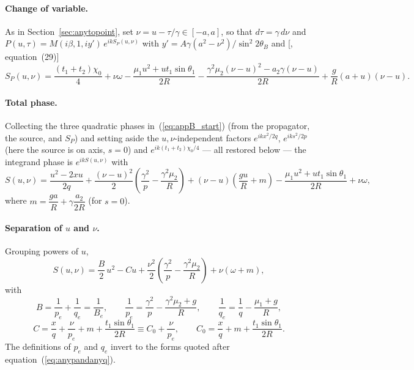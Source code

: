\documentclass[preprint]{iucr}              %
\begin{document}
\paragraph*{Change of variable.}
As in Section~\ref{sec:anytopoint}, set $\nu=u-\tau/\gamma\in[-a,a]$, so that $d\tau=\gamma\,d\nu$ and $P(u,\tau)=M(i\beta,1,iy')\,e^{ikS_P(u,\nu)}$ with $y'=A\gamma(a^2-\nu^2)/\sin^2 2\theta_B$ and [\cite{GuigayFerrero2016}, equation~(29)]
\begin{equation}
S_P(u,\nu)=\frac{(t_1+t_2)\chi_0}{4}+\nu\omega-\frac{\mu_1 u^2+ut_1\sin\theta_1}{2R}-\frac{\gamma^2\mu_2(\nu-u)^2-a_2\gamma(\nu-u)}{2R}+\frac{g}{R}(a+u)(\nu-u).
\end{equation}

\paragraph*{Total phase.}
Collecting the three quadratic phases in~(\ref{eq:appB_start}) (from the propagator, the source, and $S_P$) and setting aside the $u,\nu$-independent factors $e^{ikx^2/2q}$, $e^{iks^2/2p}$ (here the source is on axis, $s=0$) and $e^{ik(t_1+t_2)\chi_0/4}$ --- all restored below --- the integrand phase is $e^{ikS(u,\nu)}$ with
\begin{equation}
S(u,\nu)=\frac{u^2-2xu}{2q}+\frac{(\nu-u)^2}{2}\!\left(\frac{\gamma^2}{p}-\frac{\gamma^2\mu_2}{R}\right)+(\nu-u)\!\left(\frac{gu}{R}+m\right)-\frac{\mu_1u^2+ut_1\sin\theta_1}{2R}+\nu\omega,
\end{equation}
where $m=\dfrac{g a}{R}+\gamma\dfrac{a_2}{2R}$ (for $s=0$).

\paragraph*{Separation of $u$ and $\nu$.}
Grouping powers of $u$,
\begin{equation}
S(u,\nu)=\frac{B}{2}\,u^2-Cu+\frac{\nu^2}{2}\!\left(\frac{\gamma^2}{p}-\frac{\gamma^2\mu_2}{R}\right)+\nu(\omega+m),
\end{equation}
with
\begin{equation}
B=\frac{1}{p_e}+\frac{1}{q_e}=\frac{1}{B_e},\qquad
\frac{1}{p_e}=\frac{\gamma^2}{p}-\frac{\gamma^2\mu_2+g}{R},\qquad
\frac{1}{q_e}=\frac{1}{q}-\frac{\mu_1+g}{R},
\end{equation}
\begin{equation}
C=\frac{x}{q}+\frac{\nu}{p_e}+m+\frac{t_1\sin\theta_1}{2R}\equiv C_0+\frac{\nu}{p_e},\qquad
C_0=\frac{x}{q}+m+\frac{t_1\sin\theta_1}{2R}.
\end{equation}
The definitions of $p_e$ and $q_e$ invert to the forms quoted after equation~(\ref{eq:anypandanyq}).
\end{document}
